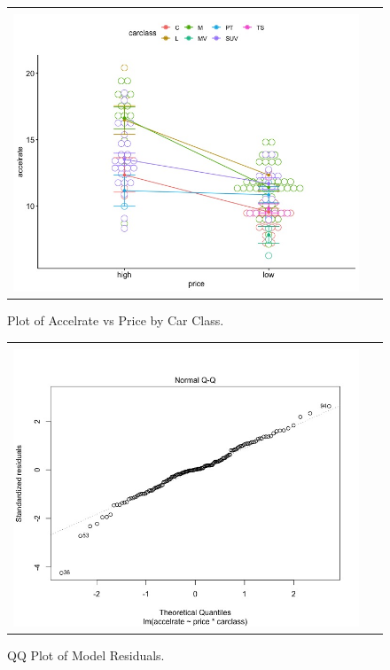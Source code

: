 \documentclass[acmsmall]{acmart}
\begin{document}
\begin{figure}[H] %
	\centering
	\begin{tabular}{| p{}|}
	\hline
	\\
	\includegraphics[width=0.95\textwidth]{../graphics/TwoWayPlot}\\
	\hline
	\end{tabular}	
	\caption{Plot of Accelrate vs Price by Car Class.} %
	\label{fig:TWA}
\end{figure}

\begin{figure}[H] %
	\centering
	\begin{tabular}{| p{}|}
	\hline
	\\
	\includegraphics[width=0.95\textwidth]{../graphics/TWAqq}\\
	\hline
	\end{tabular}	
	\caption{QQ Plot of Model Residuals.} %
	\label{fig:TWAQQ}
\end{figure}
\end{document}
